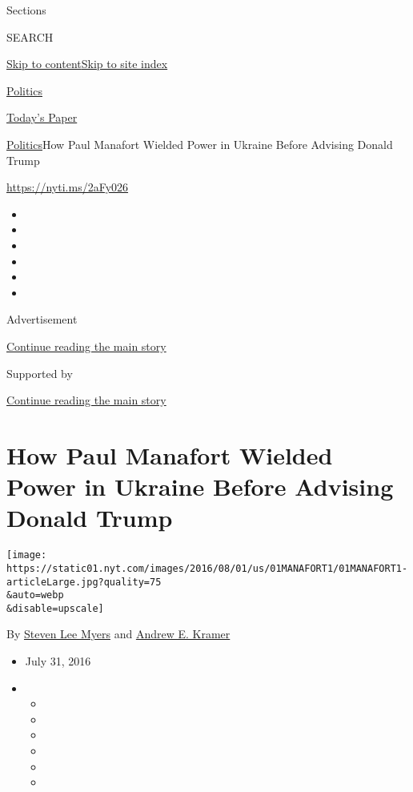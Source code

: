Sections

SEARCH

\protect\hyperlink{site-content}{Skip to
content}\protect\hyperlink{site-index}{Skip to site index}

\href{https://www.nytimes.com/section/politics}{Politics}

\href{https://myaccount.nytimes.com/auth/login?response_type=cookie\&client_id=vi}{}

\href{https://www.nytimes.com/section/todayspaper}{Today's Paper}

\href{/section/politics}{Politics}\textbar{}How Paul Manafort Wielded
Power in Ukraine Before Advising Donald Trump

\url{https://nyti.ms/2aFy026}

\begin{itemize}
\item
\item
\item
\item
\item
\item
\end{itemize}

Advertisement

\protect\hyperlink{after-top}{Continue reading the main story}

Supported by

\protect\hyperlink{after-sponsor}{Continue reading the main story}

\hypertarget{how-paul-manafort-wielded-power-in-ukraine-before-advising-donald-trump}{%
\section{How Paul Manafort Wielded Power in Ukraine Before Advising
Donald
Trump}\label{how-paul-manafort-wielded-power-in-ukraine-before-advising-donald-trump}}

\texttt{[image: https://static01.nyt.com/images/2016/08/01/us/01MANAFORT1/01MANAFORT1-articleLarge.jpg?quality=75\\\&auto=webp\\\&disable=upscale]}

By \href{http://www.nytimes.com/by/steven-lee-myers}{Steven Lee Myers}
and \href{http://www.nytimes.com/by/andrew-e-kramer}{Andrew E. Kramer}

\begin{itemize}
\item
  July 31, 2016
\item
  \begin{itemize}
  \item
  \item
  \item
  \item
  \item
  \item
  \end{itemize}
\end{itemize}

